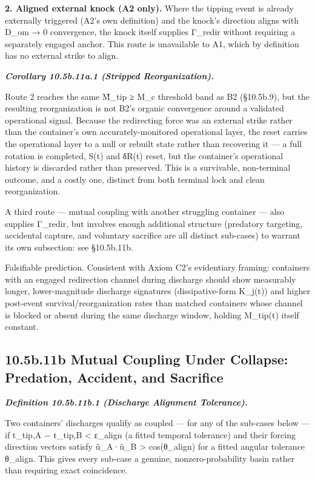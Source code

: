 \documentclass[
]{article}
\begin{document}
\textbf{2. Aligned external knock (A2 only).} Where the tipping event is
already externally triggered (A2's own definition) and the knock's
direction aligns with D\_om → 0 convergence, the knock itself supplies
Γ\_redir without requiring a separately engaged anchor. This route is
unavailable to A1, which by definition has no external strike to align.

\emph{\textbf{Corollary 10.5b.11a.1 (Stripped Reorganization).}}

Route 2 reaches the same M̃\_tip ≥ M\_c threshold band as B2 (§10.5b.9),
but the resulting reorganization is not B2's organic convergence around
a validated operational signal. Because the redirecting force was an
external strike rather than the container's own accurately-monitored
operational layer, the reset carries the operational layer to a null or
rebuilt state rather than recovering it --- a full rotation is
completed, S(t) and δR(t) reset, but the container's operational history
is discarded rather than preserved. This is a survivable, non-terminal
outcome, and a costly one, distinct from both terminal lock and clean
reorganization.

A third route --- mutual coupling with another struggling container ---
also supplies Γ\_redir, but involves enough additional structure
(predatory targeting, accidental capture, and voluntary sacrifice are
all distinct sub-cases) to warrant its own subsection: see §10.5b.11b.

Falsifiable prediction. Consistent with Axiom C2's evidentiary framing:
containers with an engaged redirection channel during discharge should
show measurably longer, lower-magnitude discharge signatures
(dissipative-form K\_j(t)) and higher post-event survival/reorganization
rates than matched containers whose channel is blocked or absent during
the same discharge window, holding M\_tip(t) itself constant.

\hypertarget{b.11b-mutual-coupling-under-collapse-predation-accident-and-sacrifice}{%
\subsection{10.5b.11b Mutual Coupling Under Collapse: Predation,
Accident, and
Sacrifice}\label{b.11b-mutual-coupling-under-collapse-predation-accident-and-sacrifice}}

\emph{\textbf{Definition 10.5b.11b.1 (Discharge Alignment Tolerance).}}

Two containers' discharges qualify as coupled --- for any of the
sub-cases below --- if t\_tip,A − t\_tip,B \textless{} ε\_align (a
fitted temporal tolerance) and their forcing direction vectors satisfy
û\_A·û\_B \textgreater{} cos(θ\_align) for a fitted angular tolerance
θ\_align. This gives every sub-case a genuine, nonzero-probability basin
rather than requiring exact coincidence.
\end{document}
